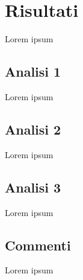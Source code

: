 \chapter{Risultati}
Lorem ipsum

\section{Analisi 1}
Lorem ipsum

\section{Analisi 2}
Lorem ipsum

\section{Analisi 3}
Lorem ipsum

\section{Commenti}
Lorem ipsum

\clearpage{\pagestyle{empty}\cleardoublepage}